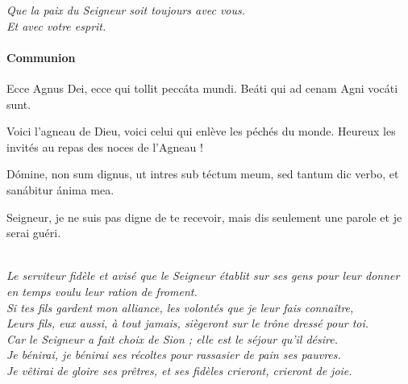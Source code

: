 \documentclass[twoside]{article}
\begin{document}
\emph{\vv Que la paix du Seigneur soit toujours avec vous.\\
\rr Et avec votre esprit.}


\pagebreak

\paragraph{Communion}
\begin{paracol}{2}

Ecce Agnus Dei, ecce qui tollit peccáta mundi.
Beáti qui ad cenam Agni vocáti sunt. 

\switchcolumn

Voici l’agneau de Dieu,
voici celui qui enlève les péchés du monde.
Heureux les invités au repas des noces de l’Agneau !

\switchcolumn*

Dómine, non sum dignus, ut intres sub téctum meum,
sed tantum dic verbo, et sanábitur ánima mea.

\switchcolumn

Seigneur, je ne suis pas digne de te recevoir, mais dis seulement une parole et je serai guéri.

\end{paracol}

 
\\
\emph{\rr Le serviteur fidèle et avisé que le Seigneur établit sur ses gens pour leur donner en temps voulu leur ration de froment.\\
\vv {} Si tes fils gardent mon alliance, les volontés que je leur fais connaître,\\
\vv {} Leurs fils, eux aussi, à tout jamais, siègeront sur le trône dressé pour toi.\\
\vv {} Car le Seigneur a fait choix de Sion ; elle est le séjour qu'il désire.\\
\vv {} Je bénirai, je bénirai ses récoltes pour rassasier de pain ses pauvres.\\
\vv {} Je vêtirai de gloire ses prêtres, et ses fidèles crieront, crieront de joie.
}

\newpage
\end{document}
